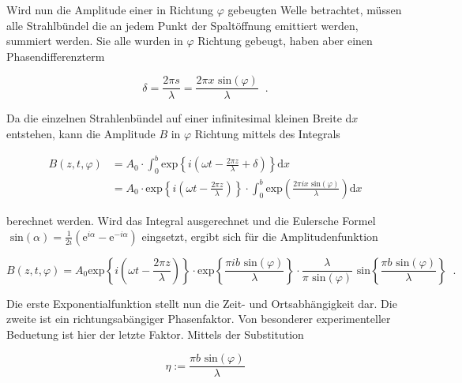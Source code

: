         \noindent Wird nun die Amplitude einer in Richtung $\varphi$ gebeugten Welle betrachtet, müssen alle Strahlbündel die an jedem Punkt der 
        Spaltöffnung emittiert werden, summiert werden. Sie alle wurden in $\varphi$ Richtung gebeugt, haben aber einen Phasendifferenzterm 

        \begin{equation*}
            \delta = \frac{2 \pi s}{\lambda} = \frac{2 \pi x \text{ sin}(\varphi)}{\lambda} \; \;.
        \end{equation*}

        \noindent Da die einzelnen Strahlenbündel auf einer infinitesimal kleinen Breite d$x$ entstehen, kann die Amplitude $B$ in 
        $\varphi$ Richtung mittels des Integrals 
        
        \begin{align*}
            B(z,t,\varphi) &= A_0 \cdot \int_0^b \text{exp}\left\{ i \left( \omega t - \frac{2 \pi z}{\lambda} + \delta \right) \right\} \text{d}x \\
                           &= A_0 \cdot \text{exp}\left\{ i \left( \omega t - \frac{2 \pi z}{\lambda} \right) \right\} \cdot \int_0^b 
                           \text{exp}\left( \frac{2 \pi i x \text{ sin} (\varphi)}{\lambda }\right) \text{d}x
        \end{align*}

        \noindent berechnet werden. Wird das Integral ausgerechnet und die Eulersche Formel $\text{ sin}(\alpha) = \frac{1}{2i}\left( 
        \text{e}^{i \alpha} - \text{e}^{-i \alpha} \right)$ eingsetzt, ergibt sich für die Amplitudenfunktion

        \begin{equation}
            B(z,t,\varphi) = A_0 \text{exp}\left\{ i \left( \omega t - \frac{2 \pi z}{\lambda} \right) \right\} \cdot
            \text{exp}\left\{ \frac{\pi i b \text{ sin}(\varphi)}{\lambda} \right\} \cdot \frac{\lambda}{\pi\text{ sin}(\varphi)}
            \text{ sin}\left\{ \frac{\pi b \text{ sin}(\varphi)}{\lambda} \right\}\; \;.
            \label{eqn:beug}
        \end{equation}

        \noindent Die erste Exponentialfunktion stellt nun die Zeit- und Ortsabhängigkeit dar. Die zweite ist ein richtungsabängiger 
        Phasenfaktor. Von besonderer experimenteller Beduetung ist hier der letzte Faktor. Mittels der Substitution 

        \begin{equation*}
            \eta := \frac{\pi b \text{ sin}(\varphi)}{\lambda}
        \end{equation*}
        
